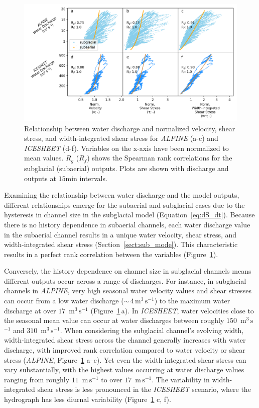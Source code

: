 \documentclass[draft]{agujournal2019}
\newcommand{\alpine}{\textit{ALPINE}}
\newcommand{\icesheet}{\textit{ICESHEET}}
\newcommand{\unit}[1]{$\mathrm{#1}$}
\begin{document}
\begin{figure}[h]
  \centering
  \includegraphics[width=0.9\linewidth]{Fig3.png}
  \caption{
    Relationship between water discharge and normalized velocity, shear stress, and width-integrated shear stress for \alpine{} (a-c) and \icesheet{} (d-f).
    Variables on the x-axis have been normalized to mean values.
    $R_g$ ($R_f$) shows the Spearman rank correlations for the subglacial (subaerial) outputs.
    Plots are shown with discharge and outputs at $15$\unit{min} intervals.
  }
  \label{fig:Qw_vari}
\end{figure}

Examining the relationship between water discharge and the model outputs, different relationships emerge for the subaerial and subglacial cases due to the hysteresis in channel size in the subglacial model (Equation~\ref{eq:dS_dt}).
Because there is no history dependence in  subaerial channels, each water discharge value in the subaerial channel results in a unique water velocity, shear stress, and width-integrated shear stress (Section~\ref{sect:sub_mode}).
This characteristic results in a perfect rank correlation between the variables (Figure~\ref{fig:Qw_vari}).

Conversely, the history dependence on channel size in subglacial channels means different outputs occur across a range of discharges.
For instance, in subglacial channels in \alpine{}, very high seasonal water velocity values and shear stresses can occur from a low water discharge  ($\sim\,4$\,\unit{m}$^3$\,\unit{s}$^{-1}$) to the maximum water discharge at over $17$ \,\unit{m}$^3$\,\unit{s}$^{-1}$ (Figure~\ref{fig:Qw_vari}\,a).
In \icesheet{}, water velocities close to the seasonal mean value can occur at water discharges between roughly $150$ \,\unit{m}$^3$\,\unit{s}$^{-1}$ and $310$ \,\unit{m}$^3$\,\unit{s}$^{-1}$.
When considering the subglacial channel's evolving width, width-integrated shear stress  across the channel generally increases with water discharge, with improved rank correlation compared to water velocity or shear stress (\alpine{}, Figure~\ref{fig:Qw_vari} a--c).
Yet even the width-integrated shear stress  can vary substantially, with the highest values occurring at water discharge values ranging from roughly $11$ \,\unit{m}\,\unit{s}$^{-1}$ to over $17$ \,\unit{m}\,\unit{s}$^{-1}$.
The variability in width-integrated shear stress is less pronounced in the \icesheet{} scenario, where the hydrograph has less diurnal variability (Figure~\ref{fig:Qw_vari} c, f).
\end{document}
